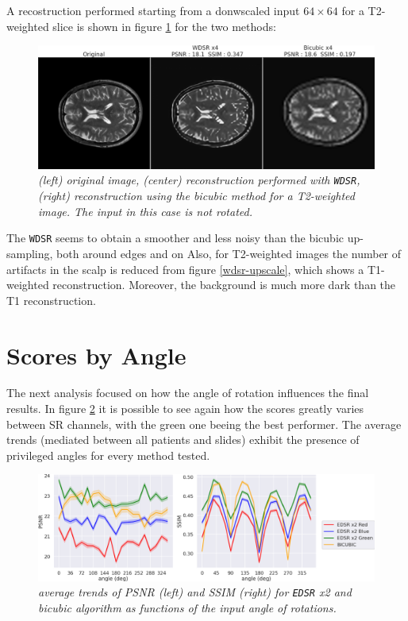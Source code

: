 \documentclass[12pt,a4paper]{report}
\begin{document}
A recostruction performed starting from a donwscaled input $64 \times 64$  for a T2-weighted slice is shown in figure \ref{wdsr-upscale-t2} for the two methods:

\begin{figure}[H]
 \centering 
  \includegraphics[scale=0.3]{./images/wdsr_comp_images_t2.png}
  \caption{\it (left) original image, (center) reconstruction performed with {\tt WDSR}, (right) reconstruction using the bicubic method for a T2-weighted image. The input in this case is not rotated.}
 \label{wdsr-upscale-t2}
\end{figure}

The {\tt WDSR} seems to obtain a smoother and less noisy than the bicubic up-sampling, both around edges and on 
Also, for T2-weighted images the number of artifacts in the scalp is reduced from figure \ref{wdsr-upscale}, which shows a T1-weighted reconstruction. 
Moreover, the background is much more dark than the T1 reconstruction. 

\section{Scores by Angle}

The next analysis focused on how the angle of rotation influences the final results. In figure \ref{fig:edsr-angles} it is possible to see again how the scores greatly varies between SR channels, with the green one beeing the best performer. The average trends (mediated between all patients and slides) exhibit the presence of privileged angles for every method tested.

\begin{figure}[H]
 \centering
 \includegraphics[scale=0.3]{./images/edsr-angles.png}
 \caption{\it average trends of PSNR (left) and SSIM (right) for {\tt EDSR} x2 and bicubic algorithm as functions of the input angle of rotations.}
 \label{fig:edsr-angles}
\end{figure}
\end{document}
